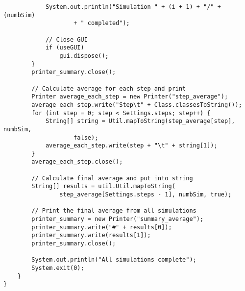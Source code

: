 \documentclass[a4paper,12pt]{article}
\begin{document}
\begin{lstlisting}
			System.out.println("Simulation " + (i + 1) + "/" + (numbSim)
					+ " completed");

			// Close GUI
			if (useGUI)
				gui.dispose();
		}
		printer_summary.close();

		// Calculate average for each step and print
		Printer average_each_step = new Printer("step_average");
		average_each_step.write("Step\t" + Class.classesToString());
		for (int step = 0; step < Settings.steps; step++) {
			String[] string = Util.mapToString(step_average[step], numbSim,
					false);
			average_each_step.write(step + "\t" + string[1]);
		}
		average_each_step.close();

		// Calculate final average and put into string
		String[] results = util.Util.mapToString(
				step_average[Settings.steps - 1], numbSim, true);

		// Print the final average from all simulations
		printer_summary = new Printer("summary_average");
		printer_summary.write("#" + results[0]);
		printer_summary.write(results[1]);
		printer_summary.close();

		System.out.println("All simulations complete");
		System.exit(0);
	}
}
\end{lstlisting}

\newpage
\end{document}
